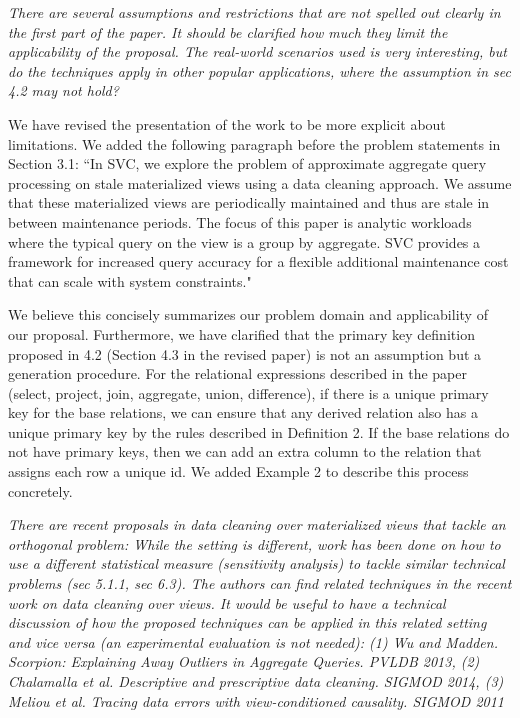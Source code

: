 \vspace{1em}
\emph{There are several assumptions and restrictions that are not spelled out clearly in the first part of the paper. It should be clarified how much they limit the applicability of the proposal. The real-world scenarios used is very interesting, but do the techniques apply in other popular applications, where the assumption in sec 4.2 may not hold?}

We have revised the presentation of the work to be more explicit about limitations. We added the following paragraph before the problem statements in Section 3.1:
``In SVC, we explore the problem of approximate aggregate query
processing on stale materialized views using a data cleaning approach.
We assume that these materialized views are periodically
maintained and thus are stale in between maintenance periods. The
focus of this paper is analytic workloads where the typical query on the view is a group by aggregate. SVC provides a framework for increased
query accuracy for a flexible additional maintenance cost that can
scale with system constraints."

We believe this concisely summarizes our problem domain and applicability of our proposal. 
Furthermore, we have clarified that the primary key definition proposed in 4.2 
(Section 4.3 in the revised paper) is not an assumption but a generation procedure. For the relational expressions described in the paper (select, project, join, aggregate, union, difference), if there is a unique primary key for the base relations, we can ensure that any derived relation also has a unique primary key by the rules described in Definition 2. If the base relations do not have primary keys, then we can add an extra column to the relation that assigns each row a unique id. We added Example 2 to describe this process concretely.

\vspace{1em}
\emph{There are recent proposals in data cleaning over materialized views that tackle an orthogonal problem: While the setting is different, work has been done on how to use a different statistical measure (sensitivity analysis) to tackle similar technical problems (sec 5.1.1, sec 6.3). The authors can find related techniques in the recent work on data cleaning over views. It would be useful to have a technical discussion of how the proposed techniques can be applied in this related setting and vice versa (an experimental evaluation is not needed): (1) Wu and Madden. Scorpion: Explaining Away Outliers in Aggregate Queries. PVLDB 2013, (2) Chalamalla et al. Descriptive and prescriptive data cleaning. SIGMOD 2014, (3) Meliou et al. Tracing data errors with view-conditioned causality. SIGMOD 2011}

